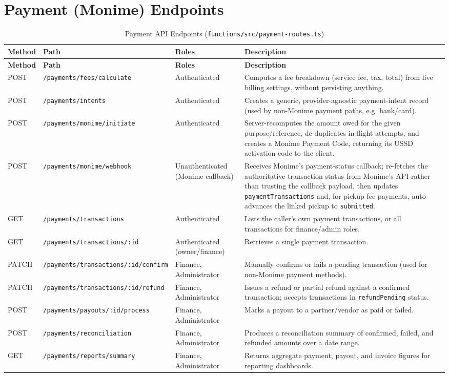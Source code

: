 \section{Payment (Monime) Endpoints}

\begin{longtable}{@{}p{1.6cm}p{5.0cm}p{2.6cm}p{5.4cm}@{}}
\caption{Payment API Endpoints (\texttt{functions/src/payment-routes.ts})} \label{tab:api-payment} \\
\toprule \textbf{Method} & \textbf{Path} & \textbf{Roles} & \textbf{Description} \\ \midrule
\endfirsthead
\toprule \textbf{Method} & \textbf{Path} & \textbf{Roles} & \textbf{Description} \\ \midrule
\endhead
POST & \texttt{/payments/fees/calculate} & Authenticated & Computes a fee breakdown (service fee, tax, total) from live billing settings, without persisting anything. \\
POST & \texttt{/payments/intents} & Authenticated & Creates a generic, provider-agnostic payment-intent record (used by non-Monime payment paths, e.g. bank/card). \\
POST & \texttt{/payments/monime/initiate} & Authenticated & Server-recomputes the amount owed for the given purpose/reference, de-duplicates in-flight attempts, and creates a Monime Payment Code, returning its USSD activation code to the client. \\
POST & \texttt{/payments/monime/webhook} & Unauthenticated (Monime callback) & Receives Monime's payment-status callback; re-fetches the authoritative transaction status from Monime's API rather than trusting the callback payload, then updates \texttt{paymentTransactions} and, for pickup-fee payments, auto-advances the linked pickup to \texttt{submitted}. \\
GET & \texttt{/payments/transactions} & Authenticated & Lists the caller's own payment transactions, or all transactions for finance/admin roles. \\
GET & \texttt{/payments/transactions/:id} & Authenticated (owner/finance) & Retrieves a single payment transaction. \\
PATCH & \texttt{/payments/transactions/:id/confirm} & Finance, Administrator & Manually confirms or fails a pending transaction (used for non-Monime payment methods). \\
PATCH & \texttt{/payments/transactions/:id/refund} & Finance, Administrator & Issues a refund or partial refund against a confirmed transaction; accepts transactions in \texttt{refundPending} status. \\
POST & \texttt{/payments/payouts/:id/process} & Finance, Administrator & Marks a payout to a partner/vendor as paid or failed. \\
POST & \texttt{/payments/reconciliation} & Finance, Administrator & Produces a reconciliation summary of confirmed, failed, and refunded amounts over a date range. \\
GET & \texttt{/payments/reports/summary} & Finance, Administrator & Returns aggregate payment, payout, and invoice figures for reporting dashboards. \\
\bottomrule
\end{longtable}

